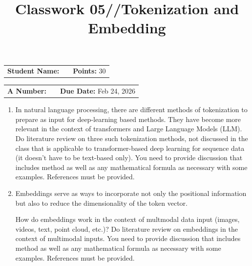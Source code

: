 \documentclass[12pt, xcolor=dvipsnames,svgnames,x11names]{article}
\makeatletter
\newcommand{\hw}{Classwork 05//Tokenization and Embedding}
\newcommand{\duedate}{Feb 24, 2026}
\renewcommand{\maketitle}{%
    \vspace*{0.2cm}
    \begin{center}
        \begin{tcolorbox}[
            enhanced,
            colback=white,
            colframe=headerRed,
            arc=0mm,
            title={\textcolor{white}{\bfseries \@title}},
            coltitle=white,
            fonttitle=\bfseries\large,
            attach boxed title to top left={xshift=10pt, yshift=-\tcboxedtitleheight/2},
            boxed title style={sharp corners, colback=headerRed, frame hidden}
        ]
        \large
        \vspace{10pt}
\noindent
\begin{tabular}{@{}p{3.5cm}p{6cm}r@{}}
\textbf{Student Name:} & \underline{\hspace{6cm}} & \textbf{Points:} 30 \\
\end{tabular}

\vspace{10pt}

\noindent
\begin{tabular}{@{}p{3.5cm}p{6cm}r@{}}
\textbf{A Number:} & \underline{\hspace{6cm}} & \textbf{Due Date:} \duedate \\
\end{tabular}
        \end{tcolorbox}
    \end{center}
    \vspace{10pt}
}
\makeatother
\begin{document}
\title{\hw}
\maketitle

\begin{enumerate}

\item In natural language processing, there are different methods of tokenization to prepare as input for deep-learning based methods. They have become more relevant in the context of transformers and Large Language Models (LLM). Do literature review on three such tokenization methods, not discussed in the class that is applicable to transformer-based deep learning for sequence data (it doesn't have to be text-based only). You need to provide discussion that includes method as well as any mathematical formula as necessary with some examples. References must be provided.


\item Embeddings serve as ways to incorporate not only the positional information but also to reduce the dimensionality of the token vector. 

How do embeddings work in the context of multmodal data input (images, videos, text, point cloud, etc.)?  Do literature review on embeddings in the context of multimodal inputs.  You need to provide discussion that includes method as well as any mathematical formula as necessary with some examples. References must be provided.


\end{enumerate}
\end{document}
